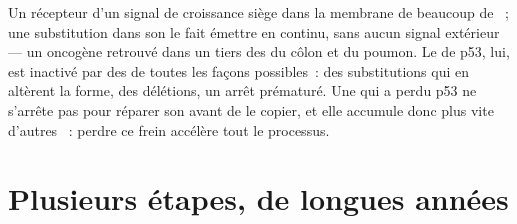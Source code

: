 \begin{example}\label{ex:g11:cancer:genes}
Un récepteur d'un signal de croissance siège dans la membrane de
beaucoup de ~; une substitution dans son  le fait émettre
en continu, sans aucun signal extérieur --- un oncogène retrouvé dans
un tiers des  du côlon et du poumon. Le  de p53, lui, est
inactivé par des  de toutes les façons possibles~: des
substitutions qui en altèrent la forme, des délétions, un arrêt
prématuré. Une  qui a perdu p53 ne s'arrête pas pour réparer son
 avant de le copier, et elle accumule donc plus vite d'autres
~: perdre ce frein accélère tout le processus.
\end{example}

\section{Plusieurs étapes, de longues années}

